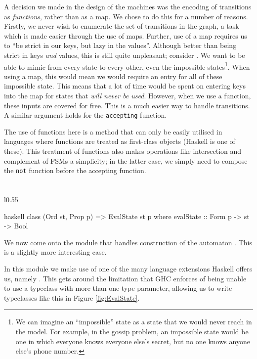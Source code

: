 \documentclass[10pt, a4paper]{report}
\begin{document}
A decision we made in the design of the machines was the encoding of transitions
as \emph{functions}, rather than as a map. We chose to do this for a number of
reasons. Firstly, we never wish to enumerate the set of transitions in the
graph, a task which is made easier through the use of maps. Further, use of a
map requires us to ``be strict in our keys, but lazy in the values''. Although
better than being strict in keys \emph{and} values, this is still quite
unpleasant; consider \mestar. We want to be able to mimic from every state to
every other, even the impossible states\footnote{We can imagine an
  ``impossible'' state as a state that we would never reach in the model. For
  example, in the gossip problem, an impossible state would be one in which
  everyone knows everyone else's secret, but no one knows anyone else's phone
  number.}. When using a map, this would mean we would require an entry for all
of these impossible state. This means that a lot of time would be spent on
entering keys into the map for states that \emph{will never be used}. However,
when we use a function, these inputs are covered for free. This is a much easier
way to handle transitions. A similar argument holds for the
\texttt{accepting} function.

The use of functions here is a method that can only be easily utilised in
languages where functions are treated as first-class objects (Haskell is one of
these). This treatment of functions also makes operations like intersection and
complement of FSMs a simplicity; in the latter case, we simply need to compose
the \texttt{not} function before the accepting function. 

\section{}
\label{sec:MEHaskell}

\begin{wrapfigure}{l}{0.55\textwidth}
  \begin{cminted}{haskell}
    class (Ord st, Prop p) => EvalState st p where
      evalState :: Form p -> st -> Bool
\end{cminted}
  \caption{}
  \label{fig:EvalState}
\end{wrapfigure}

We now come onto the module that handles construction of the automaton \mestar.
This is a slightly more interesting case.

In this module we make use of one of the many language extensions Haskell offers
us, namely . This gets around the limitation that
GHC enforces of being unable to use a typeclass with more than one type
parameter, allowing us to write typeclasses like this in Figure
\ref{fig:EvalState}.
\end{document}
